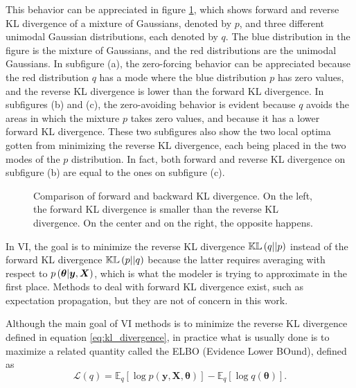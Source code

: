 This behavior can be appreciated in figure \ref{fig:KL_example}, which shows forward and reverse KL divergence of a mixture of Gaussians, denoted by $p$, and three different unimodal Gaussian distributions, each denoted by $q$. The blue distribution in the figure is the mixture of Gaussians, and the red distributions are the unimodal Gaussians.
In subfigure (a), the zero-forcing behavior can be appreciated because the red distribution $q$ has a mode where the blue distribution $p$ has zero values, and the reverse KL divergence is lower than the forward KL divergence.
In subfigures (b) and (c), the zero-avoiding behavior is evident because $q$ avoids the areas in which the mixture $p$ takes zero values, and because it has a lower forward KL divergence. These two subfigures also show the two local optima gotten from minimizing the reverse KL divergence, each being placed in the two modes of the $p$ distribution. In fact, both forward and reverse KL divergence on subfigure (b) are equal to the ones on subfigure (c).

\begin{figure}[H]
  \centering
  \hfill
  \hfill
  \caption{Comparison of forward and backward KL divergence. On the left, the forward KL divergence is smaller than the reverse KL divergence. On the center and on the right, the opposite happens.}
  \label{fig:KL_example}
\end{figure}

In VI, the goal is to minimize the reverse KL divergence $\mathbb{KL}\left( q || p \right)$ instead of the forward KL divergence $\mathbb{KL}\left( p || q \right)$ because the latter requires averaging with respect to $p\left( \boldsymbol{\theta} | \boldsymbol{y}, \boldsymbol{X} \right)$, which is what the modeler is trying to approximate in the first place. Methods to deal with forward KL divergence exist, such as expectation propagation, but they are not of concern in this work.

Although the main goal of VI methods is to minimize the reverse KL divergence defined in equation \eqref{eq:kl_divergence}, in practice what is usually done is to maximize a related quantity called the ELBO (Evidence Lower BOund), defined as
\begin{equation}
  \label{eq:elbo_def}
  \mathcal{L}(q) = \mathbb{E}_q\left[ \log p(\boldsymbol{y}, \boldsymbol{X}, \boldsymbol{\theta}) \right] - \mathbb{E}_q\left[ \log q(\boldsymbol{\theta}) \right].
\end{equation}

